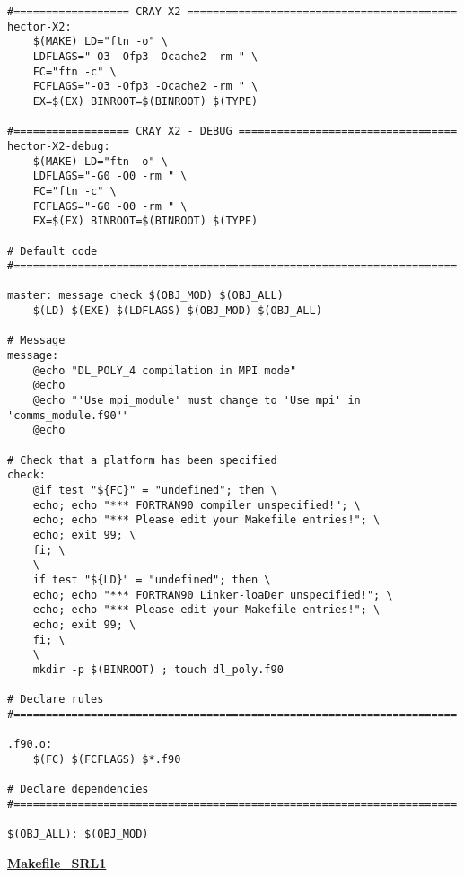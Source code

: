\begin{verbatim}
#================== CRAY X2 ==========================================
hector-X2:
	$(MAKE) LD="ftn -o" \
	LDFLAGS="-O3 -Ofp3 -Ocache2 -rm " \
	FC="ftn -c" \
	FCFLAGS="-O3 -Ofp3 -Ocache2 -rm " \
	EX=$(EX) BINROOT=$(BINROOT) $(TYPE)

#================== CRAY X2 - DEBUG ==================================
hector-X2-debug:
	$(MAKE) LD="ftn -o" \
	LDFLAGS="-G0 -O0 -rm " \
	FC="ftn -c" \
	FCFLAGS="-G0 -O0 -rm " \
	EX=$(EX) BINROOT=$(BINROOT) $(TYPE)

# Default code
#=====================================================================

master: message check $(OBJ_MOD) $(OBJ_ALL)
	$(LD) $(EXE) $(LDFLAGS) $(OBJ_MOD) $(OBJ_ALL)

# Message
message:
	@echo "DL_POLY_4 compilation in MPI mode"
	@echo
	@echo "'Use mpi_module' must change to 'Use mpi' in 'comms_module.f90'"
	@echo

# Check that a platform has been specified
check:
	@if test "${FC}" = "undefined"; then \
	echo; echo "*** FORTRAN90 compiler unspecified!"; \
	echo; echo "*** Please edit your Makefile entries!"; \
	echo; exit 99; \
	fi; \
	\
	if test "${LD}" = "undefined"; then \
	echo; echo "*** FORTRAN90 Linker-loaDer unspecified!"; \
	echo; echo "*** Please edit your Makefile entries!"; \
	echo; exit 99; \
	fi; \
	\
	mkdir -p $(BINROOT) ; touch dl_poly.f90

# Declare rules
#=====================================================================

.f90.o:
	$(FC) $(FCFLAGS) $*.f90

# Declare dependencies
#=====================================================================

$(OBJ_ALL): $(OBJ_MOD)
\end{verbatim}
\clearpage
{\sc \bf \underline{Makefile\_SRL1}}
